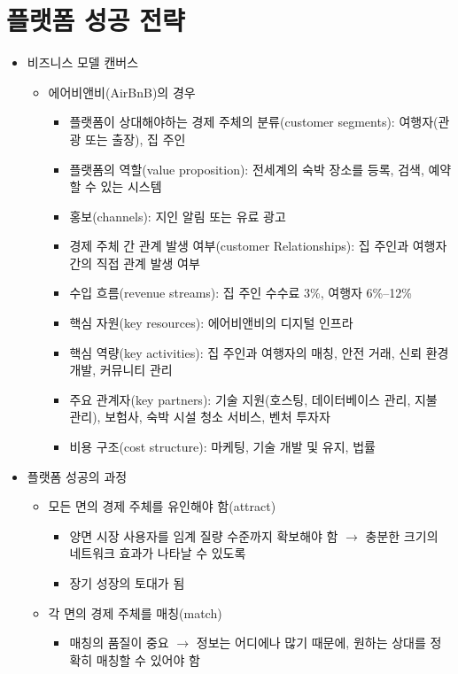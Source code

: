 \section{플랫폼 성공 전략}\label{sec:}
\begin{itemize}
\item 비즈니스 모델 캔버스 \cite[pp. 43--45]{Reillier:2017tt}
	\begin{itemize}
	\item 에어비앤비(AirBnB)의 경우
		\begin{itemize}
		\item 플랫폼이 상대해야하는 경제 주체의 분류(customer segments): 여행자(관광 또는 출장), 집 주인
		\item 플랫폼의 역할(value proposition): 전세계의 숙박 장소를 등록, 검색, 예약할 수 있는 시스템
		\item 홍보(channels): 지인 알림 또는 유료 광고
		\item 경제 주체 간 관계 발생 여부(customer Relationships): 집 주인과 여행자 간의 직접 관계 발생 여부
		\item 수입 흐름(revenue streams): 집 주인 수수료 3\%, 여행자 6\%--12\%
		\item 핵심 자원(key resources): 에어비앤비의 디지털 인프라
		\item 핵심 역량(key activities): 집 주인과 여행자의 매칭, 안전 거래, 신뢰 환경 개발, 커뮤니티 관리
		\item 주요 관계자(key partners): 기술 지원(호스팅, 데이터베이스 관리, 지불 관리), 보험사, 숙박 시설 청소 서비스, 벤처 투자자
		\item 비용 구조(cost structure): 마케팅, 기술 개발 및 유지, 법률
		\end{itemize}
	\end{itemize}
\item 플랫폼 성공의 과정 \cite[ch. 5]{Reillier:2017tt}
	\begin{itemize}
	\item 모든 면의 경제 주체를 유인해야 함(attract)
		\begin{itemize}
		\item 양면 시장 사용자를 임계 질량 수준까지 확보해야 함 $\rightarrow$ 충분한 크기의 네트워크 효과가 나타날 수 있도록
		\item 장기 성장의 토대가 됨
		\end{itemize}
	\item 각 면의 경제 주체를 매칭(match)
		\begin{itemize}
		\item 매칭의 품질이 중요 $\rightarrow$ 정보는 어디에나 많기 때문에, 원하는 상대를 정확히 매칭할 수 있어야 함

\end{itemize}
\end{itemize}
\end{itemize}
